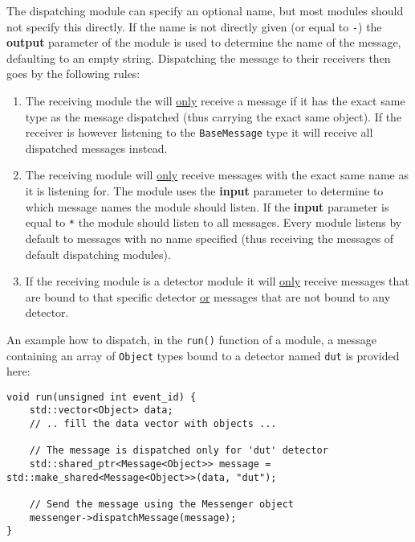 The dispatching module can specify an optional name, but most modules should not specify this directly. If the name is not directly given (or equal to \texttt{-}) the \textbf{output} parameter of the module is used to determine the name of the message, defaulting to an empty string. Dispatching the message to their receivers then goes by the following rules:
\begin{enumerate}
\item The receiving module the will \underline{only} receive a message if it has the exact same type as the message dispatched (thus carrying the exact same object). If the receiver is however listening to the \texttt{BaseMessage} type it will receive all dispatched messages instead.
\item The receiving module will \underline{only} receive messages with the exact same name as it is listening for. The module uses the \textbf{input} parameter to determine to which message names the module should listen. If the \textbf{input} parameter is equal to \texttt{*} the module should listen to all messages. Every module listens by default to messages with no name specified (thus receiving the messages of default dispatching modules).
\item If the receiving module is a detector module it will \underline{only} receive messages that are bound to that specific detector \underline{or} messages that are not bound to any detector.
\end{enumerate}

An example how to dispatch, in the \texttt{run()} function of a module, a message containing an array of \texttt{Object} types bound to a detector named \texttt{dut} is provided here:
\begin{verbatim}
void run(unsigned int event_id) {
    std::vector<Object> data;
    // .. fill the data vector with objects ...
    
    // The message is dispatched only for 'dut' detector
    std::shared_ptr<Message<Object>> message = std::make_shared<Message<Object>>(data, "dut");
    
    // Send the message using the Messenger object
    messenger->dispatchMessage(message);
}
\end{verbatim}

